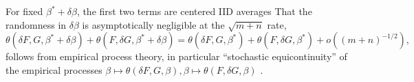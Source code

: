 \documentclass[12pt]{article}
\newcommand{\E}{E}
\renewcommand{\star}[1]{{#1}^\ast}
\newcommand{\F}{F}
\newcommand{\G}{G}
\newcommand{\N}{m+n}
\newcommand{\auc}{\theta}
\theoremstyle{definition}
\begin{document}


For fixed $\star\beta+\delta\beta$, the first two terms are centered IID averages
That the randomness in $\delta\beta$ is asymptotically negligible at the $\sqrt {\N}$ rate,
$$
\auc(\delta\F,\G,\star\beta+\delta\beta)+\auc(\F,\delta\G,\star\beta+\delta\beta)
=\auc(\delta\F,\G,\star\beta)+\auc(\F,\delta\G,\star\beta) + o((\N)^{-1/2}),
$$
follows from empirical process theory, in particular ``stochastic
equicontinuity'' of the empirical processes $\beta \mapsto \auc(\delta\F,\G,\beta), \beta \mapsto \auc(\F,\delta\G,\beta)$ \citep{pollard1984}. %
\end{document}
